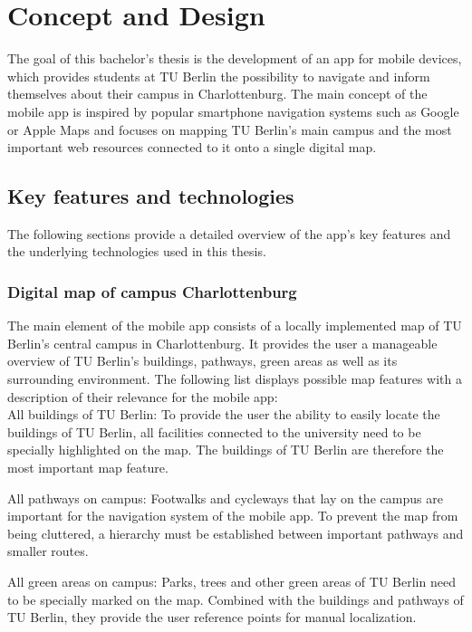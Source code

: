\chapter{Concept and Design}
\label{cha:conceptanddesign}
The goal of this bachelor's thesis is the development of an app for mobile devices, which provides students at TU Berlin the possibility to navigate and inform themselves about their campus in Charlottenburg. The main concept of the mobile app is inspired by popular smartphone navigation systems such as Google or Apple Maps and focuses on mapping TU Berlin's main campus and the most important web resources connected to it onto a single digital map.

\section{Key features and technologies}
The following sections provide a detailed overview of the app's key features and the underlying technologies used in this thesis.

\subsection{Digital map of campus Charlottenburg}
The main element of the mobile app consists of a locally implemented map of TU Berlin's central campus in Charlottenburg. It provides the user a manageable overview of TU Berlin's buildings, pathways, green areas as well as its surrounding environment. The following list displays possible map features with a description of their relevance for the mobile app:\\

All buildings of TU Berlin: To provide the user the ability to easily locate the buildings of TU Berlin, all facilities connected to the university need to be specially highlighted on the map. The buildings of TU Berlin are therefore the most important map feature.

All pathways on campus: Footwalks and cycleways that lay on the campus are important for the navigation system of the mobile app. To prevent the map from being cluttered, a hierarchy must be established between important pathways and smaller routes.

All green areas on campus: Parks, trees and other green areas of TU Berlin need to be specially marked on the map. Combined with the buildings and pathways of TU Berlin, they provide the user reference points for manual localization.

